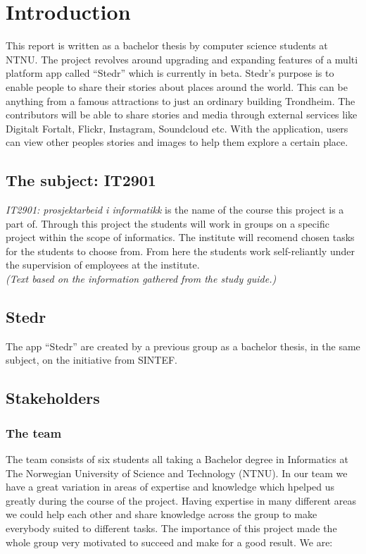 \section{Introduction}
	\setcounter{page}{1}


This report is written as a bachelor thesis by computer science students at NTNU. The project revolves around upgrading and expanding features of a multi platform app called “Stedr” which is currently in beta. Stedr's purpose is to enable people to share their stories about places around the world. This can be anything from a famous attractions to just an ordinary building Trondheim. The contributors will be able to share stories and media through external services like Digitalt Fortalt, Flickr, Instagram, Soundcloud etc. With the application, users can view other peoples stories and images  to help them explore a certain place.

\subsection{The subject: IT2901}
\emph{IT2901: prosjektarbeid i informatikk} is the name of the course this project is a part of. Through this project the students will work in groups on a specific project within the scope of informatics. The institute will recomend chosen tasks for the students to choose from. From here the students work self-reliantly under the supervision of employees at the institute.\\ \textit{(Text based on the information gathered from the study guide.)}

\subsection{Stedr}
The app “Stedr” are created by a previous group as a bachelor thesis, in the same subject, on the initiative from SINTEF. 

\subsection{Stakeholders}

\subsubsection{The team}
The team consists of six students all taking a Bachelor degree in Informatics at The Norwegian University of Science and Technology (NTNU). In our team we have a great variation in areas of expertise and knowledge which hpelped us greatly during the course of the project. Having expertise in many different areas we could help each other and share knowledge across the group to make everybody suited to different tasks. The importance of this project made the whole group very motivated to succeed and make for a good result.
We are:\\

